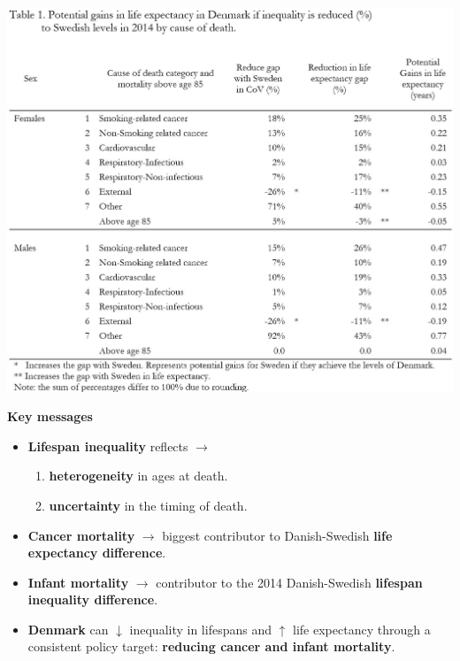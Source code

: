 \documentclass[xcolor={dvipsnames}]{beamer}
\begin{document}
\begin{frame}
\begin{center}
	\includegraphics[scale=.26]{Figures/Table_1}	
	\end{center}

\end{frame}


\begin{frame}
\Large{\textbf{Key messages} \pause
		\begin{itemize}
		
		\item<1-> \textbf{Lifespan inequality} reflects $\longrightarrow$ 
		\begin{enumerate}
				 \item \textbf{heterogeneity} in ages at death.
				 \item \textbf{uncertainty} in the timing of death. 
		\end{enumerate}

		
		\item<3-> \textbf{Cancer mortality} $\longrightarrow$ biggest contributor to Danish-Swedish \textbf{life expectancy difference}.
		
		\item<4-> \textbf{Infant mortality} $\longrightarrow$ contributor to the 2014 Danish-Swedish \textbf{lifespan inequality difference}.
				
        \item<5-> \textbf{Denmark} can $\downarrow$ inequality in lifespans and $\uparrow$ life expectancy through a consistent policy target: \textbf{reducing cancer and infant mortality}.
		
		\end{itemize}
		
}

\end{frame}
\end{document}
